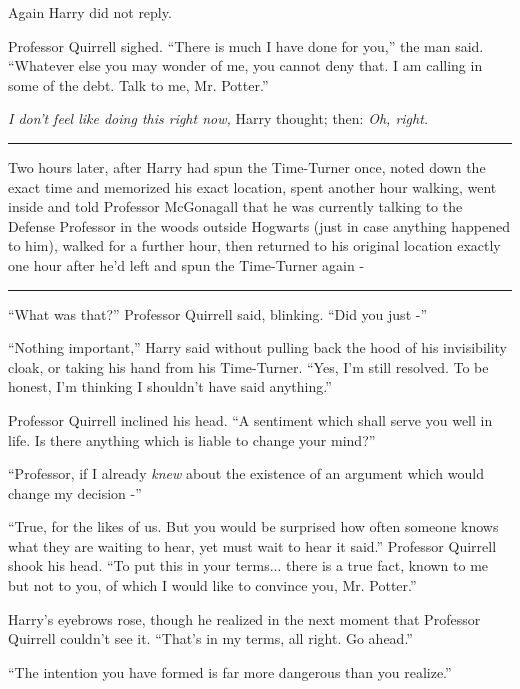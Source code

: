 Again Harry did not reply.

Professor Quirrell sighed. ``There is much I have done for you,'' the
man said. ``Whatever else you may wonder of me, you cannot deny that. I
am calling in some of the debt. Talk to me, Mr. Potter.''

\emph{I don't feel like doing this right now,} Harry thought; then:
\emph{Oh, right.}

\begin{center}\rule{3in}{0.4pt}\end{center}

Two hours later, after Harry had spun the Time-Turner once, noted down
the exact time and memorized his exact location, spent another hour
walking, went inside and told Professor McGonagall that he was currently
talking to the Defense Professor in the woods outside Hogwarts (just in
case anything happened to him), walked for a further hour, then returned
to his original location exactly one hour after he'd left and spun the
Time-Turner again -

\begin{center}\rule{3in}{0.4pt}\end{center}

``What was that?'' Professor Quirrell said, blinking. ``Did you just -''

``Nothing important,'' Harry said without pulling back the hood of his
invisibility cloak, or taking his hand from his Time-Turner. ``Yes, I'm
still resolved. To be honest, I'm thinking I shouldn't have said
anything.''

Professor Quirrell inclined his head. ``A sentiment which shall serve
you well in life. Is there anything which is liable to change your
mind?''

``Professor, if I already \emph{knew} about the existence of an argument
which would change my decision -''

``True, for the likes of us. But you would be surprised how often
someone knows what they are waiting to hear, yet must wait to hear it
said.'' Professor Quirrell shook his head. ``To put this in your
terms... there is a true fact, known to me but not to you, of which
I would like to convince you, Mr. Potter.''

Harry's eyebrows rose, though he realized in the next moment that
Professor Quirrell couldn't see it. ``That's in my terms, all right. Go
ahead.''

``The intention you have formed is far more dangerous than you
realize.''

